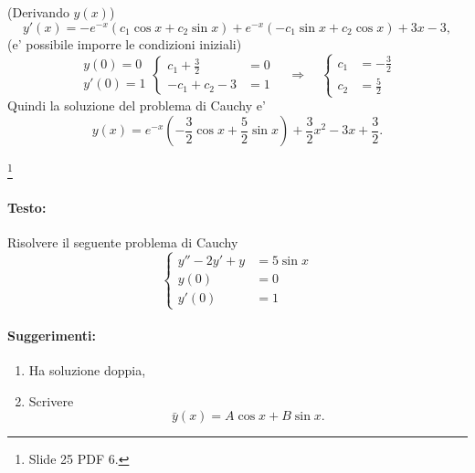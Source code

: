 \begin{example}
\begin{equation*}
	\end{equation*}
	(Derivando $y(x)$)
	\begin{equation*}
		y'(x) = -e^{-x} (c_1\cos x + c_2\sin x) + e^{-x} (-c_1\sin x + c_2\cos x) + 3 x - 3,
	\end{equation*}
	(e' possibile imporre le condizioni iniziali)
	\begin{equation*}
		\begin{matrix}
			y(0) = 0\\
			y'(0) = 1
		\end{matrix}
		\begin{cases}
			c_1 + \frac{3}{2} &= 0\\
			-c_1 + c_2 - 3 &=1
		\end{cases}\quad\Rightarrow\quad
		\begin{cases}
			c_1 &= - \frac{3}{2}\\
			c_2 &= \frac{5}{2}
		\end{cases}
	\end{equation*}
	Quindi la soluzione del problema di Cauchy e'
	\begin{equation*}
		y(x) = e^{-x}\left(-\frac{3}{2}\cos x + \frac{5}{2} \sin x\right) + \frac{3}{2} x^2 - 3x + \frac{3}{2}. 
	\end{equation*}
\end{example}

\begin{exercise}\footnote{Slide 25 PDF 6.}
	\paragraph{Testo:} Risolvere il seguente problema di Cauchy
	\begin{equation*}
		\begin{cases}
			y'' - 2 y' + y &= 5\sin x\\
			y(0) &= 0\\
			y'(0) &= 1
		\end{cases}
	\end{equation*}
	\paragraph{Suggerimenti:}
	\begin{enumerate}
		\item Ha soluzione doppia,
		\item Scrivere
		\begin{equation*}
			\bar y(x) = A\cos x + B\sin x.
		\end{equation*}
	\end{enumerate}
\end{exercise}


